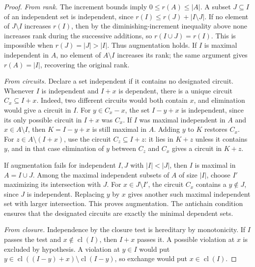 \documentclass[11pt,oneside,openany]{book}
\theoremstyle{plain}
\theoremstyle{definition}
\theoremstyle{remark}
\begin{document}
\begin{proof}
\smallskip
\emph{From rank.}
The increment bounds imply \(0\le r(A)\le |A|\). A subset
\(J\subseteq I\) of an independent set is independent, since
\(r(I)\le r(J)+|I\setminus J|\). If no element of \(J\setminus I\)
increases \(r(I)\), then by the diminishing-increment inequality
above none increases rank during the successive additions, so
\(r(I\cup J)=r(I)\). This is impossible when \(r(J)=|J|>|I|\).
Thus augmentation holds. If \(I\) is maximal independent in \(A\),
no element of \(A\setminus I\) increases its rank; the same
argument gives \(r(A)=|I|\), recovering the original rank.

\smallskip
\emph{From circuits.}
Declare a set independent if it contains no designated circuit.
Whenever \(I\) is independent and \(I+x\) is dependent, there
is a unique circuit \(C_x\subseteq I+x\). Indeed, two different
circuits would both contain \(x\), and elimination would give a
circuit in \(I\). For \(y\in C_x-x\), the set \(I-y+x\) is
independent, since its only possible circuit in \(I+x\) was \(C_x\).
If \(I\) was maximal independent in \(A\) and \(x\in A\setminus I\),
then \(K=I-y+x\) is still maximal in \(A\). Adding \(y\) to \(K\)
restores \(C_x\). For \(z\in A\setminus(I+x)\), use the circuit
\(C_z\subseteq I+z\): it lies in \(K+z\) unless it contains
\(y\), and in that case elimination of \(y\) between \(C_z\)
and \(C_x\) gives a circuit in \(K+z\).

If augmentation fails for independent \(I,J\) with \(|I|<|J|\),
then \(I\) is maximal in \(A=I\cup J\). Among the maximal
independent subsets of \(A\) of size \(|I|\), choose \(I'\)
maximizing its intersection with \(J\). For \(x\in J\setminus
I'\), the circuit \(C_x\) contains a \(y\notin J\), since \(J\)
is independent. Replacing \(y\) by \(x\) gives another such
maximal independent set with larger intersection. This proves
augmentation. The antichain condition ensures that the
designated circuits are exactly the minimal dependent sets.

\smallskip
\emph{From closure.}
Independence by the closure test is hereditary by monotonicity.
If \(I\) passes the test and \(x\notin\operatorname{cl}(I)\),
then \(I+x\) passes it. A possible violation at \(x\) is excluded
by hypothesis. A violation at \(y\in I\) would put
\(y\in\operatorname{cl}((I-y)+x)\setminus\operatorname{cl}(I-y)\),
so exchange would put \(x\in\operatorname{cl}(I)\).


\end{proof}
\end{document}

